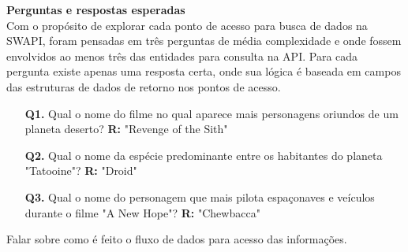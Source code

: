 \textbf{Perguntas e respostas esperadas} \\

Com o propósito de explorar cada ponto de acesso para busca de dados na SWAPI, foram pensadas em três perguntas de média complexidade e onde fossem envolvidos ao menos três das entidades para consulta na API. Para cada pergunta existe apenas uma resposta certa, onde sua lógica é baseada em campos das estruturas de dados de retorno nos pontos de acesso.

\begin{enumerate}
\item[\textbf{Q1.}] Qual o nome do filme no qual aparece mais personagens oriundos de um planeta deserto? \textbf{R:} "Revenge of the Sith"
\item[\textbf{Q2.}] Qual o nome da espécie predominante entre os habitantes do planeta "Tatooine"? \textbf{R:} "Droid"
\item[\textbf{Q3.}] Qual o nome do personagem que mais pilota espaçonaves e veículos durante o filme "A New Hope"? \textbf{R:} "Chewbacca" \\
\end{enumerate}

Falar sobre como é feito o fluxo de dados para acesso das informações.

